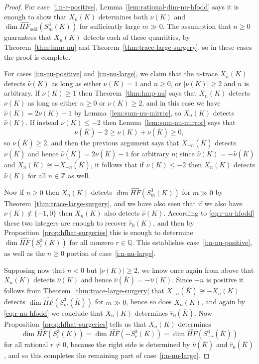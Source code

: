 \documentclass[11pt]{amsart}
\numberwithin{equation}{section}
\numberwithin{theorem}{section}
\theoremstyle{definition}
\newcommand{\Z}{\mathbb{Z}}
\newcommand{\Q}{\mathbb{Q}}
\newcommand{\hfhat}{\widehat{\mathit{HF}}}
\newcommand{\godd}{\mathrm{odd}}
\newcommand{\mirror}[1]{\overline{#1}}
\begin{document}
\begin{proof}
For case~\eqref{i:n-r-positive}, Lemma~\ref{lem:rational-dim-nu-hfodd} says it is enough to show that $X_n(K)$ determines both $\nu(K)$ and $\dim \hfhat_\godd(S^3_m(K))$ for sufficiently large $m \gg 0$.  The assumption that $n \geq 0$ guarantees that $X_n(K)$ detects each of these quantities, by Theorem~\ref{thm:hmp-nu} and Theorem~\ref{thm:trace-large-surgery}, so in these cases the proof is complete.

For cases \eqref{i:n-nu-positive} and \eqref{i:n-nu-large}, we claim that the $n$-trace $X_n(K)$ detects $\hat\nu(K)$ as long as either $\nu(K) = 1$ and $n\geq 0$, or $|\nu(K)| \geq 2$ and $n$ is arbitrary.  If $\nu(K) \geq 1$ then Theorem~\ref{thm:hmp-nu} says that $X_n(K)$ detects $\nu(K)$ as long as either $n\geq 0$ or $\nu(K) \geq 2$, and in this case we have $\hat\nu(K) = 2\nu(K)-1$ by Lemma~\ref{lem:sum-nu-mirror}, so $X_n(K)$ detects $\hat\nu(K)$.  If instead $\nu(K) \leq -2$ then Lemma~\ref{lem:sum-nu-mirror} says that 
\[ \nu(\mirror{K}) -2 \geq \nu(K)+\nu(\mirror{K}) \geq 0, \]
so $\nu(\mirror{K}) \geq 2$, and then the previous argument says that $X_{-n}(\mirror{K})$ detects $\nu(\mirror{K})$ and hence $\hat\nu(\mirror{K})=2\nu(\mirror{K})-1$ for arbitrary $n$; since $\hat\nu(K) = -\hat\nu(\mirror{K})$ and $X_n(K) \cong -X_{-n}(\mirror{K})$, it follows that if $\nu(K) \leq -2$ then $X_n(K)$ detects $\hat\nu(K)$ for all $n\in\Z$ as well.

Now if $n \geq 0$ then $X_n(K)$ detects $\dim \hfhat(S^3_m(K))$ for $m\gg0$ by Theorem~\ref{thm:trace-large-surgery}, and we have also seen that if we also have $\nu(K) \not\in \{-1,0\}$ then $X_n(K)$ also detects $\hat\nu(K)$.  According to \eqref{eq:r-nu-hfodd} these two integers are enough to recover $\hat{r}_0(K)$, and then by Proposition~\ref{prop:hfhat-surgeries} this is enough to determine $\dim \hfhat(S^3_r(K))$ for all nonzero $r\in\Q$.  This establishes case~\eqref{i:n-nu-positive}, as well as the $n\geq 0$ portion of case~\eqref{i:n-nu-large}.

Supposing now that $n<0$ but $|\nu(K)| \geq 2$, we know once again from above that $X_n(K)$ detects $\hat\nu(K)$ and hence $\hat\nu(\mirror{K}) = -\hat\nu(K)$.  Since $-n$ is positive it follows from Theorem~\ref{thm:trace-large-surgery} that $X_{-n}(\mirror{K}) \cong -X_n(K)$ detects $\dim \hfhat(S^3_m(\mirror{K}))$ for $m\gg0$, hence so does $X_n(K)$, and again by \eqref{eq:r-nu-hfodd} we conclude that $X_n(K)$ determines $\hat{r}_0(\mirror{K})$.  Now Proposition~\ref{prop:hfhat-surgeries} tells us that $X_n(K)$ determines
\begin{equation} \label{eq:reverse-r}
\dim \hfhat(S^3_r(K)) = \dim \hfhat(-S^3_r(K)) = \dim \hfhat(S^3_{-r}(\mirror{K}))
\end{equation}
for all rational $r\neq 0$, because the right side is determined by $\hat\nu(\mirror{K})$ and $\hat{r}_0(\mirror{K})$, and so this completes the remaining part of case~\eqref{i:n-nu-large}.
\end{proof}
\end{document}
